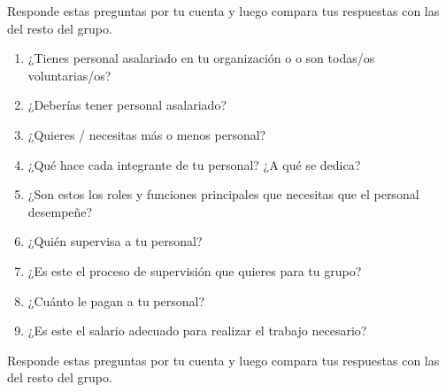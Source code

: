 Responde estas preguntas por tu cuenta y
luego compara tus respuestas con las del resto del grupo.


\begin{enumerate}

\item
  ¿Tienes personal asalariado en tu organización o 
  o son todas/os voluntarias/os?

\item
  ¿Deberías tener personal asalariado?

\item
  ¿Quieres / necesitas más o menos personal?

\item
  ¿Qué hace cada integrante de tu personal? ¿A qué se dedica?

\item
  ¿Son estos los roles y funciones principales que necesitas que el personal desempeñe?

\item
  ¿Quién supervisa a tu personal?

\item
  ¿Es este el proceso de supervisión que quieres para tu grupo?

\item
  ¿Cuánto le pagan a tu personal?

\item
  ¿Es este el salario adecuado para realizar el trabajo necesario?

\end{enumerate}


Responde estas preguntas por tu cuenta y
luego compara tus respuestas con las del resto del grupo.

